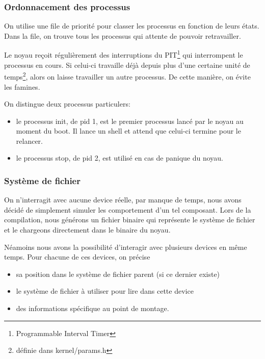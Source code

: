 \documentclass[10pt,a4paper]{beamer}
\begin{document}
\begin{frame}
  \frametitle{Ordonnacement des processus}
  On utilise une file de priorité pour classer les processus en fonction de leurs états. Dans la file, on trouve tous les processus qui attente de pouvoir retravailler.

  Le noyau reçoit régulièrement des interruptions du PIT\footnote{Programmable Interval Timer} qui interrompent le processus en cours. Si celui-ci travaille déjà depuis plus d'une certaine unité de temps\footnote{définie dans kernel/params.h}, alors on laisse travailler un autre processus. De cette manière, on évite les famines.

  On distingue deux processus particulers:
  \begin{itemize}
  \item le processus \textrm{init}, de pid 1, est le premier processus lancé par le noyau au moment du boot. Il lance un shell et attend que celui-ci termine pour le relancer.
  \item le processus \textrm{stop}, de pid 2, est utilisé en cas de panique du noyau.
  \end{itemize}

\end{frame}

\begin{frame}
  \frametitle{Système de fichier}

  On n'interragit avec aucune device réelle, par manque de temps, nous avons décidé de simplement simuler les comportement d'un tel composant. Lors de la compilation, nous générons un fichier binaire qui représente le système de fichier et le chargeons directement dans le binaire du noyau.


  Néamoins nous avons la possibilité d'interagir avec plusieurs devices en même temps. Pour chacune de ces devices, on précise
  \begin{itemize}
  \item sa position dans le système de fichier parent (si ce dernier existe)
  \item le système de fichier à utiliser pour lire dans cette device
  \item des informations spécifique au point de montage.
  \end{itemize}
\end{frame}
\end{document}
